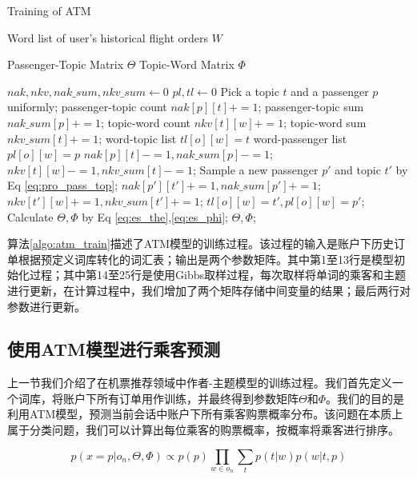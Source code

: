 \begin{algorithm}
\caption{Training of ATM}
\label{algo:atm_train}
\begin{algorithmic}[1]
\Require
\Statex Word list of user's historical flight orders $W$

\Ensure 
\Statex Passenger-Topic Matrix $\Theta$
\Statex Topic-Word Matrix $\Phi$

\State $nak , nkv, nak\_sum, nkv\_sum \gets 0$
\State $pl , tl \gets 0$
\State Pick a topic $t$ and a passenger $p$ uniformly;
\State passenger-topic count $nak[p][t] += 1$;
\State passenger-topic sum $nak\_sum[p] += 1$;
\State topic-word count $nkv[t][w] += 1$;
\State topic-word sum $nkv\_sum[t] += 1$;
\State word-topic list $tl[o][w] = t$
\State word-passenger list $pl[o][w] = p$
\EndFor
\EndFor
{}
\State $nak[p][t] -= 1, nak\_sum[p] -= 1$;
\State $nkv[t][w] -= 1, nkv\_sum[t] -= 1$;
\State Sample a new passenger $p'$ and topic $t'$ by Eq \ref{eq:pro_pass_top};
\State $nak[p'][t'] += 1, nak\_sum[p'] += 1$;
\State $nkv[t'][w] += 1, nkv\_sum[t'] += 1$;
\State $tl[o][w] = t', pl[o][w] = p'$;
\EndFor
\EndFor
\EndWhile
\State Calculate $\Theta,\Phi$ by Eq \ref{eq:es_the},\ref{eq:es_phi};
\State \Return $\Theta,\Phi$;
\end{algorithmic} 
\end{algorithm}

算法\ref{algo:atm_train}描述了ATM模型的训练过程。该过程的输入是账户下历史订单根据预定义词库转化的词汇表；输出是两个参数矩阵。其中第1至13行是模型初始化过程；其中第14至25行是使用Gibbs取样过程，每次取样将单词的乘客和主题进行更新，在计算过程中，我们增加了两个矩阵存储中间变量的结果；最后两行对参数进行更新。

\subsection{使用ATM模型进行乘客预测}

上一节我们介绍了在机票推荐领域中作者-主题模型的训练过程。我们首先定义一个词库，将账户下所有订单用作训练，并最终得到参数矩阵$\Theta$和$\Phi$。我们的目的是利用ATM模型，预测当前会话中账户下所有乘客购票概率分布。该问题在本质上属于分类问题，我们可以计算出每位乘客的购票概率，按概率将乘客进行排序。

\begin{equation}
\label{eq:pred_pass}
p(x=p|o_n,\Theta,\Phi) \propto p(p)\prod_{w \in o_n}\sum_t p(t|w)p(w|t,p)
\end{equation}

